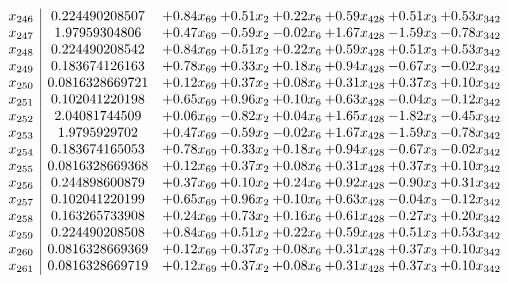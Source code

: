 \documentclass[8pt]{article}
\begin{document}
\[\begin{array}{c| c c@{\hskip 2pt} c@{\hskip 2pt} c@{\hskip 2pt} c@{\hskip 2pt} c@{\hskip 2pt} c@{\hskip 2pt} }
 x_{246}   &  0.224490208507 & +  0.84 x_{69} & +  0.51 x_{2} & +  0.22 x_{6} & +  0.59 x_{428} & +  0.51 x_{3} & +  0.53 x_{342}\\
 x_{247}   &  1.97959304806 & +  0.47 x_{69} & -0.59 x_{2} & -0.02 x_{6} & +  1.67 x_{428} & -1.59 x_{3} & -0.78 x_{342}\\
 x_{248}   &  0.224490208542 & +  0.84 x_{69} & +  0.51 x_{2} & +  0.22 x_{6} & +  0.59 x_{428} & +  0.51 x_{3} & +  0.53 x_{342}\\
 x_{249}   &  0.183674126163 & +  0.78 x_{69} & +  0.33 x_{2} & +  0.18 x_{6} & +  0.94 x_{428} & -0.67 x_{3} & -0.02 x_{342}\\
 x_{250}   &  0.0816328669721 & +  0.12 x_{69} & +  0.37 x_{2} & +  0.08 x_{6} & +  0.31 x_{428} & +  0.37 x_{3} & +  0.10 x_{342}\\
 x_{251}   &  0.102041220198 & +  0.65 x_{69} & +  0.96 x_{2} & +  0.10 x_{6} & +  0.63 x_{428} & -0.04 x_{3} & -0.12 x_{342}\\
 x_{252}   &  2.04081744509 & +  0.06 x_{69} & -0.82 x_{2} & +  0.04 x_{6} & +  1.65 x_{428} & -1.82 x_{3} & -0.45 x_{342}\\
 x_{253}   &  1.9795929702 & +  0.47 x_{69} & -0.59 x_{2} & -0.02 x_{6} & +  1.67 x_{428} & -1.59 x_{3} & -0.78 x_{342}\\
 x_{254}   &  0.183674165053 & +  0.78 x_{69} & +  0.33 x_{2} & +  0.18 x_{6} & +  0.94 x_{428} & -0.67 x_{3} & -0.02 x_{342}\\
 x_{255}   &  0.0816328669368 & +  0.12 x_{69} & +  0.37 x_{2} & +  0.08 x_{6} & +  0.31 x_{428} & +  0.37 x_{3} & +  0.10 x_{342}\\
 x_{256}   &  0.244898600879 & +  0.37 x_{69} & +  0.10 x_{2} & +  0.24 x_{6} & +  0.92 x_{428} & -0.90 x_{3} & +  0.31 x_{342}\\
 x_{257}   &  0.102041220199 & +  0.65 x_{69} & +  0.96 x_{2} & +  0.10 x_{6} & +  0.63 x_{428} & -0.04 x_{3} & -0.12 x_{342}\\
 x_{258}   &  0.163265733908 & +  0.24 x_{69} & +  0.73 x_{2} & +  0.16 x_{6} & +  0.61 x_{428} & -0.27 x_{3} & +  0.20 x_{342}\\
 x_{259}   &  0.224490208508 & +  0.84 x_{69} & +  0.51 x_{2} & +  0.22 x_{6} & +  0.59 x_{428} & +  0.51 x_{3} & +  0.53 x_{342}\\
 x_{260}   &  0.0816328669369 & +  0.12 x_{69} & +  0.37 x_{2} & +  0.08 x_{6} & +  0.31 x_{428} & +  0.37 x_{3} & +  0.10 x_{342}\\
 x_{261}   &  0.0816328669719 & +  0.12 x_{69} & +  0.37 x_{2} & +  0.08 x_{6} & +  0.31 x_{428} & +  0.37 x_{3} & +  0.10 x_{342}\\

\end{array}\]
\end{document}
